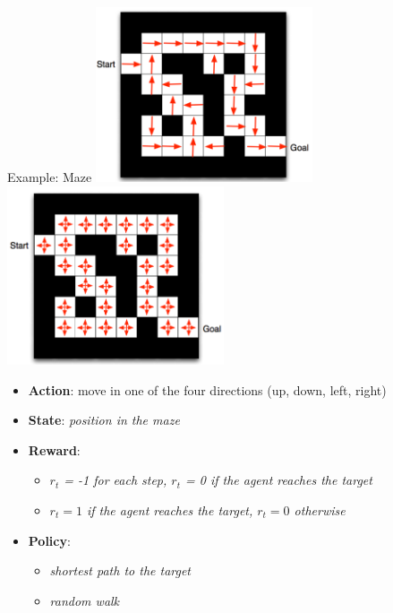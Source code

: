 \documentclass[presentation, 9pt]{beamer}\mode<presentation>{\usetheme{AMSBolognaFC}}
\begin{document}
\begin{frame}{Example: Maze}
\centering
\includegraphics[width=0.48\textwidth]{img/shortest.png}
\includegraphics[width=0.48\textwidth]{img/maze-random.png}
\begin{itemize}
	\item \textbf{Action}: move in one of the four directions (up, down, left, right)
	\item \textbf{State}: \emph{position in the maze}
	\item \textbf{Reward}: 
	\begin{itemize}
		\item \emph{$r_t$ = -1 for each step, $r_t$ = 0 if the agent reaches the target}
		\item \emph{$r_t = 1$ if the agent reaches the target, $r_t = 0$ otherwise}
	\end{itemize}
	\item \textbf{Policy}: 
	\begin{itemize}
		\item \emph{shortest path to the target}
		\item \emph{random walk}
	\end{itemize}
\end{itemize}
\end{frame}
\end{document}

